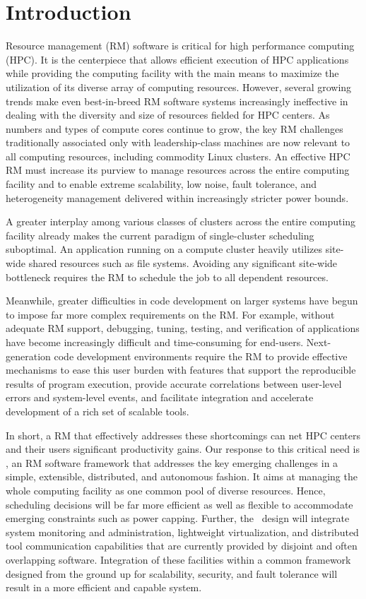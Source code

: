 \section{Introduction}

Resource management (RM) software is critical
for high performance computing (HPC).
It is the centerpiece that allows efficient
execution of HPC applications while providing
the computing facility with the main means
to maximize the utilization of its diverse array of computing
resources.
However, several growing trends make even
best-in-breed RM software systems increasingly ineffective
in dealing with the diversity and size of resources fielded for HPC centers.
As numbers and types of compute cores
continue to grow, the key RM challenges traditionally associated only
with leadership-class machines are now
relevant to all computing resources, including
commodity Linux clusters. An effective HPC RM must increase
its purview to manage resources across the entire
computing facility and to enable extreme scalability,
low noise, fault tolerance,
and heterogeneity management delivered within increasingly
stricter power bounds.

A greater interplay among various classes
of clusters across the entire computing facility already 
makes the current paradigm of single-cluster scheduling
suboptimal. An application running on a compute
cluster heavily utilizes site-wide shared resources
such as file systems.
Avoiding any significant site-wide bottleneck
requires the RM to schedule the job to all dependent
resources.

Meanwhile, greater difficulties in code development
on larger systems have begun to impose far more complex
requirements on the RM. For example, without adequate
RM support, debugging, tuning, testing, and verification
of applications have become increasingly difficult
and time-consuming for end-users.
Next-generation code development environments
require the RM to provide effective mechanisms
to ease this user burden with features that support the reproducible results of program execution,
provide accurate correlations between user-level errors
and system-level events,
and facilitate integration and accelerate development of a rich set of scalable tools.

In short, a RM that effectively
addresses these shortcomings can net HPC centers
and their users significant productivity gains.
Our response to this critical need is \flux,
an RM software framework that addresses the key emerging
challenges in a simple, extensible, distributed,
and autonomous fashion.
It aims at managing the whole computing facility
as one common pool of diverse resources.
Hence, scheduling decisions will be far more efficient
as well as flexible to accommodate emerging constraints
such as power capping.
Further, the \flux\ design will integrate system monitoring and
administration, lightweight virtualization, 
and distributed tool communication capabilities 
that are currently provided by disjoint
and often overlapping software. 
Integration of these facilities within a common framework
designed from the ground up for scalability, security,
and fault tolerance will result in a more efficient
and capable system.

